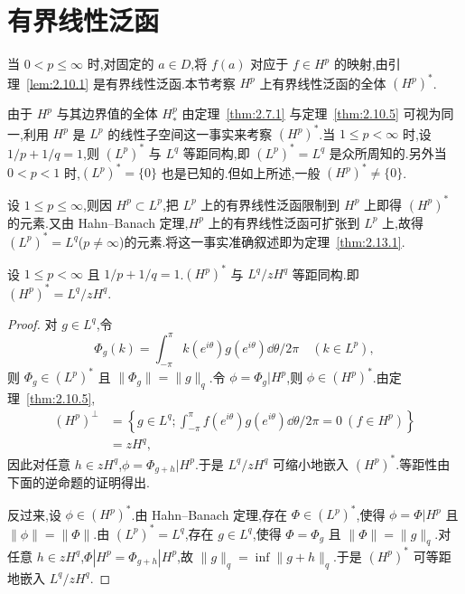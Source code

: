 \section{有界线性泛函}\label{sec:2.13}


当 $0 < p \leq \infty$ 时,对固定的 $a \in D$,将 $f(a)$ 对应于 $f \in H^{p}$ 的映射,由引理~\ref{lem:2.10.1} 是有界线性泛函.本节考察 $H^{p}$ 上有界线性泛函的全体 $(H^{p})^{*}$.

由于 $H^{p}$ 与其边界值的全体 $H_{*}^{p}$ 由定理~\ref{thm:2.7.1} 与定理~\ref{thm:2.10.5} 可视为同一,利用 $H^{p}$ 是 $L^{p}$ 的线性子空间这一事实来考察 $(H^{p})^{*}$.当 $1 \leq p < \infty$ 时,设 $1/p + 1/q = 1$,则 $(L^{p})^{*}$ 与 $L^{q}$ 等距同构,即 $(L^{p})^{*} = L^{q}$ 是众所周知的.另外当 $0 < p < 1$ 时,$(L^{p})^{*} = \{0\}$ 也是已知的.但如上所述,一般 $(H^{p})^{*} \neq \{0\}$.

设 $1 \leq p \leq \infty$,则因 $H^{p} \subset L^{p}$,把 $L^{p}$ 上的有界线性泛函限制到 $H^{p}$ 上即得 $(H^{p})^{*}$ 的元素.又由 Hahn--Banach 定理,$H^{p}$ 上的有界线性泛函可扩张到 $L^{p}$ 上,故得 $(L^{p})^{*} = L^{q}$($p \neq \infty$)的元素.将这一事实准确叙述即为定理~\ref{thm:2.13.1}.

\begin{theorem}\label{thm:2.13.1}
设 $1 \leq p < \infty$ 且 $1/p + 1/q = 1$.$(H^{p})^{*}$ 与 $L^{q}/zH^{q}$ 等距同构.即 $(H^{p})^{*} = L^{q}/zH^{q}$.
\end{theorem}

\begin{proof}
对 $g \in L^{q}$,令
\begin{equation*}
\Phi_{g}(k) = \int_{-\pi}^{\pi} k(e^{i\theta}) g(e^{i\theta})\dd \theta / 2\pi \quad (k \in L^{p}),
\end{equation*}
则 $\Phi_{g} \in (L^{p})^{*}$ 且 $\|\Phi_{g}\| = \|g\|_{q}$.令 $\phi = \Phi_{g}|H^{p}$,则 $\phi \in (H^{p})^{*}$.由定理~\ref{thm:2.10.5},
\begin{align*}
(H^{p})^{\perp} & = \left\{g \in L^{q}; \int_{-\pi}^{\pi} f(e^{i\theta}) g(e^{i\theta})\dd \theta / 2\pi = 0 \ (f \in H^{p}) \right\} \\
& = zH^{q},
\end{align*}
因此对任意 $h \in zH^{q}$,$\phi = \Phi_{g+h}|H^{p}$.于是 $L^{q}/zH^{q}$ 可缩小地嵌入 $(H^{p})^{*}$.等距性由下面的逆命题的证明得出.

反过来,设 $\phi \in (H^{p})^{*}$.由 Hahn--Banach 定理,存在 $\Phi \in (L^{p})^{*}$,使得 $\phi = \Phi|H^{p}$ 且 $\|\phi\| = \|\Phi\|$.由 $(L^{p})^{*} = L^{q}$,存在 $g \in L^{q}$,使得 $\Phi = \Phi_{g}$ 且 $\|\Phi\| = \|g\|_{q}$.对任意 $h \in zH^{q}$,$\Phi|H^{p} = \Phi_{g+h}|H^{p}$,故 $\|g\|_{q} = \inf \|g + h\|_{q}$.于是 $(H^{p})^{*}$ 可等距地嵌入 $L^{q}/zH^{q}$.
\end{proof}

